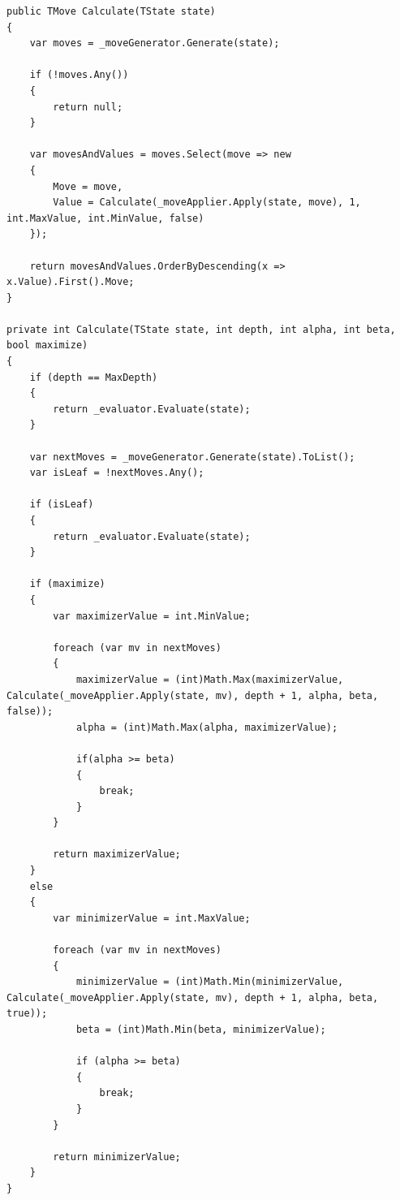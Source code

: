 \documentclass[twoside, a4paper, 12pt]{article}
\begin{document}
\begin{lstlisting}[caption=Alfa-béta algoritmus, label=lst:alphabeta_code, float]
public TMove Calculate(TState state)
{
	var moves = _moveGenerator.Generate(state);
	
	if (!moves.Any())
	{
		return null;
	}
	
	var movesAndValues = moves.Select(move => new
	{
		Move = move,
		Value = Calculate(_moveApplier.Apply(state, move), 1, int.MaxValue, int.MinValue, false)
	});
	
	return movesAndValues.OrderByDescending(x => x.Value).First().Move;
}

private int Calculate(TState state, int depth, int alpha, int beta, bool maximize)
{
	if (depth == MaxDepth)
	{
		return _evaluator.Evaluate(state);
	}
	
	var nextMoves = _moveGenerator.Generate(state).ToList();
	var isLeaf = !nextMoves.Any();
	
	if (isLeaf)
	{
		return _evaluator.Evaluate(state);
	}
	
	if (maximize)
	{
		var maximizerValue = int.MinValue;
		
		foreach (var mv in nextMoves)
		{
			maximizerValue = (int)Math.Max(maximizerValue, Calculate(_moveApplier.Apply(state, mv), depth + 1, alpha, beta, false));
			alpha = (int)Math.Max(alpha, maximizerValue);
			
			if(alpha >= beta)
			{
				break;
			}
		}
		
		return maximizerValue;
	}
	else
	{
		var minimizerValue = int.MaxValue;
		
		foreach (var mv in nextMoves)
		{
			minimizerValue = (int)Math.Min(minimizerValue, Calculate(_moveApplier.Apply(state, mv), depth + 1, alpha, beta, true));
			beta = (int)Math.Min(beta, minimizerValue);
			
			if (alpha >= beta)
			{
				break;
			}
		}
		
		return minimizerValue;
	}
}
\end{lstlisting}



\newpage
\end{document}
